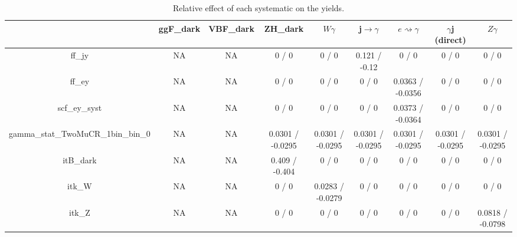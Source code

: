 \documentclass[10pt]{article}
\begin{document}
\begin{table}[htbp]
\begin{center}
\begin{tabular}{|c|c|c|c|c|c|c|c|c|}
\hline 
      & ggF_{dark}      & VBF_{dark}      & ZH_{dark}      & $W\gamma$      & j$\rightarrow\gamma$      & $e\rightsquigarrow\gamma$      & $\gamma$j (direct)      & $Z\gamma$ \\ 
\hline 
  ff_jy &    NA    &    NA    & 0 / 0 & 0 / 0 & 0.121 / -0.12 & 0 / 0 & 0 / 0 & 0 / 0 \\ 
  ff_ey &    NA    &    NA    & 0 / 0 & 0 / 0 & 0 / 0 & 0.0363 / -0.0356 & 0 / 0 & 0 / 0 \\ 
  scf_ey_syst &    NA    &    NA    & 0 / 0 & 0 / 0 & 0 / 0 & 0.0373 / -0.0364 & 0 / 0 & 0 / 0 \\ 
  gamma_stat_TwoMuCR_1bin_bin_0 &    NA    &    NA    & 0.0301 / -0.0295 & 0.0301 / -0.0295 & 0.0301 / -0.0295 & 0.0301 / -0.0295 & 0.0301 / -0.0295 & 0.0301 / -0.0295 \\ 
  it{B}_{dark} &    NA    &    NA    & 0.409 / -0.404 & 0 / 0 & 0 / 0 & 0 / 0 & 0 / 0 & 0 / 0 \\ 
   it{k_{W}} &    NA    &    NA    & 0 / 0 & 0.0283 / -0.0279 & 0 / 0 & 0 / 0 & 0 / 0 & 0 / 0 \\ 
   it{k_{Z}} &    NA    &    NA    & 0 / 0 & 0 / 0 & 0 / 0 & 0 / 0 & 0 / 0 & 0.0818 / -0.0798 \\ 
\hline 
\end{tabular} 
\caption{Relative effect of each systematic on the yields.} 
\end{center} 
\end{table} 
\end{document}
